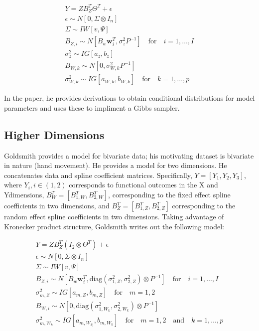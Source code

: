 \documentclass[AMA,Times1COL]{WileyNJDv5} %
\begin{document}
\begin{equation}
    \begin{split}
        Y = ZB_Z^T\Theta^T + \epsilon\\
        \epsilon\sim N[0, \Sigma\otimes I_n]\\
        \Sigma \sim IW[v, \Psi]\\
        B_{Z,i} \sim N[B_w \boldsymbol{w}_i^T, \sigma_z^2P^{-1}]\quad \text{for} \quad i = 1,\dots, I\\
        \sigma_z^2 \sim IG[a_z, b_z]\\
        B_{W, k} \sim N[0, \sigma_{W,k}^2P^{-1}]\\
        \sigma_{W,k}^2 \sim IG[a_{W,k}, b_{W,k}]\quad \text{for} \quad k = 1,\dots, p
    \end{split}
\end{equation}

In the paper, he provides derivations to obtain conditional distributions for model parameters and uses these to impliment a Gibbs sampler.  

\subsection{Higher Dimensions}
Goldsmith provides a model for bivariate data; his motivating dataset is bivariate in nature (hand movement).  He provides a model for two dimensions\cite{goldsmith_assessing_2016}.  He concatenates data and spline coefficient matrices.  Specifically, \(Y = [Y_1,Y_2, Y_3]\), where \(Y_i, i\in(1,2)\) corresponds to functional outcomes in the X and Ydimensions, \(B_W^T = [B_{1,W}^T, B_{2,W}^T]\), corresponding to the fixed effect spline coefficients in two dimensions, and \(B_Z^T = [B_{1,Z}^T, B_{2,Z}^T]\) corresponding to the random effect spline coefficients in two dimensions.  Taking advantage of Kronecker product structure,  Goldsmith writes out the following model:

\begin{equation}
    \begin{split}
        Y = ZB_Z^T\left(I_2 \otimes\Theta^T\right) + \epsilon\\
        \epsilon\sim N[0, \Sigma\otimes I_n]\\
        \Sigma \sim IW[v, \Psi]\\
        B_{Z,i} \sim N[B_w \boldsymbol{w}_i^T, \text{diag}\left(\sigma_{1,Z}^2, \sigma_{2,Z}^2\right)\otimes P^{-1}]\quad \text{for} \quad i = 1,\dots, I\\
        \sigma_{m,Z}^2 \sim IG[a_{m,Z}, b_{m,Z}]\quad \text{for} \quad m = 1,2\\
        B_{W,i} \sim N[0, \text{diag}\left(\sigma_{1,W_{k}}^2, \sigma_{2,W_{k}}^2\right)\otimes P^{-1}]\\
        \sigma_{m,W_{k}}^2 \sim IG[a_{m,W_{k]}}, b_{m,W_{k}}]\quad \text{for} \quad m = 1,2 \quad\text{and} \quad k = 1,\dots, p
    \end{split}
\end{equation}
\end{document}
